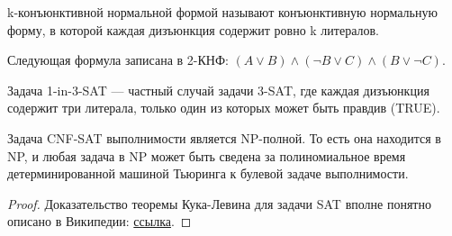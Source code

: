     \begin{Def}[k-КНФ]
        k-конъюнктивной нормальной формой называют конъюнктивную нормальную форму, в которой каждая дизъюнкция содержит ровно k литералов.
    \end{Def}
    \begin{Example}
        Следующая формула записана в 2-КНФ:
        $(A\lor B)\land (\neg B\lor C)\land (B\lor \neg C)$.
    \end{Example}
    \begin{Def}
        Задача 1-in-3-SAT --- частный случай задачи 3-SAT, где каждая дизъюнкция содержит три литерала, только один из которых может быть правдив (TRUE).
    \end{Def}
    \begin{Thm}
        Задача CNF-SAT выполнимости является NP-полной. То есть она находится в NP, и любая задача в NP может быть сведена за полиномиальное время детерминированной машиной Тьюринга к булевой задаче выполнимости.
    \end{Thm}
    \begin{proof}
        Доказательство теоремы Кука-Левина для задачи SAT вполне понятно описано в Википедии: 
        \href{https://en.wikipedia.org/wiki/Cook%E2%80%93Levin_theorem}{ссылка}. 
    \end{proof}

    
